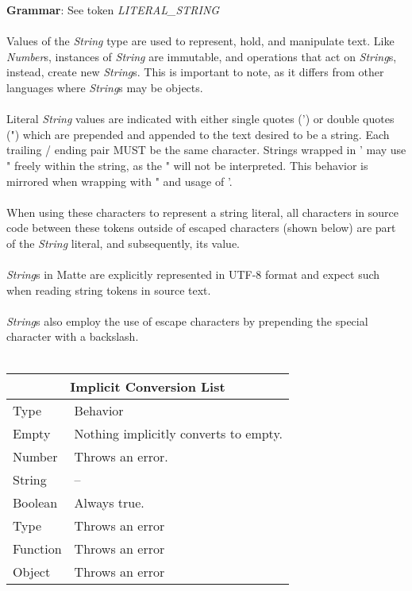 \documentclass[12pt,letterpaper]{report}
\begin{document}
\textbf{Grammar}: See token \textit{LITERAL\_STRING}
\\\\
Values of the \textit{String} type are used to represent, hold, and manipulate text.
Like \textit{Number}s, instances of \textit{String} are immutable, and operations 
that act on \textit{String}s, instead, create new \textit{String}s. This is 
important to note, as it differs from other languages where \textit{String}s 
may be objects.
\\\\
Literal \textit{String} values are indicated with either single quotes (') or double quotes (")
which are prepended and appended to the text desired to be a string. Each trailing /
ending pair MUST be the same character. Strings wrapped in ' may use " freely within 
the string, as the " will not be interpreted. This behavior is mirrored when wrapping with " and usage of '.
\\\\
When using these characters to represent a string literal, all characters in source code between these tokens 
outside of escaped characters (shown below) are part of the \textit{String} literal, and subsequently, 
its value.
\\\\
\textit{String}s in Matte are explicitly represented in UTF-8 format and expect such 
when reading string tokens in source text.
\\\\
\textit{String}s also employ the use of escape characters by prepending the special 
character with a backslash.
\\\\
{
\centering
\begin{tabular}{ |p{2.5cm}||p{10cm}|  }
  \hline
  \multicolumn{2}{|c|}{Implicit Conversion List} \\
  \hline
  Type & Behavior\\
  \hline
  Empty & Nothing implicitly converts to empty.\\
  Number  & Throws an error. \\
  String & --\\
  Boolean & Always true. \\
  Type & Throws an error\\
  Function & Throws an error\\
  Object & Throws an error\\
 \hline
\end{tabular}
}
\end{document}
